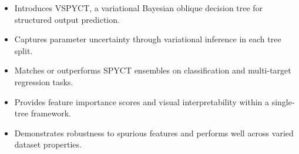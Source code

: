 \documentclass{article}
\begin{document}
\begin{itemize}
\item Introduces VSPYCT, a variational Bayesian oblique decision tree for structured output prediction.
\item Captures parameter uncertainty through variational inference in each tree split.
\item Matches or outperforms SPYCT ensembles on classification and multi-target regression tasks.
\item Provides feature importance scores and visual interpretability within a single-tree framework.
\item Demonstrates robustness to spurious features and performs well across varied dataset properties.
\end{itemize}
\end{document}
